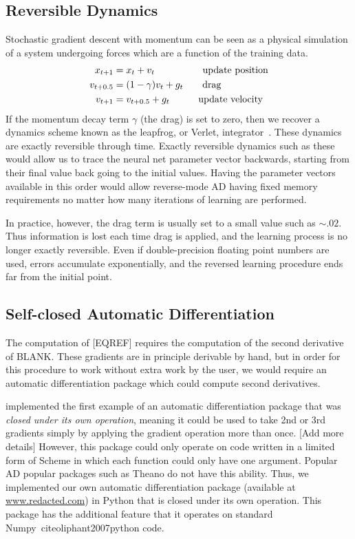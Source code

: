 \documentclass{article}
\newcommand{\drag}{\gamma}
\begin{document}
\subsection{Reversible Dynamics}

Stochastic gradient descent with momentum can be seen as a physical simulation of a system undergoing forces which are a function of the training data.
\begin{align}
x_{t+1} & = x_t + v_t \qquad \qquad \quad \textnormal{update position}\\
v_{t+0.5} & = (1 - \drag) v_t + g_t \quad \quad \textnormal{drag}\\
v_{t+1} & = v_{t+0.5} + g_t \qquad \quad \textnormal{update velocity}
\end{align}
If the momentum decay term $\gamma$ (the drag) is set to zero, then we recover a dynamics scheme known as the leapfrog, or Verlet, integrator~\citep{leapfrog1995}.
These dynamics are exactly reversible through time.
Exactly reversible dynamics such as these would allow us to trace the neural net parameter vector backwards, starting from their final value back going to the initial values.
Having the parameter vectors available in this order would allow reverse-mode AD having fixed memory requirements no matter how many iterations of learning are performed.

In practice, however, the drag term is usually set to a small value such as $\sim.02$.
Thus information is lost each time drag is applied, and the learning process is no longer exactly reversible.
Even if double-precision floating point numbers are used, errors accumulate exponentially, and the reversed learning procedure ends far from the initial point.



\subsection{Self-closed Automatic Differentiation}

The computation of [EQREF] requires the computation of the second derivative of BLANK.
These gradients are in principle derivable by hand, but in order for this procedure to work without extra work by the user, we would require an automatic differentiation package which could compute second derivatives.

\citet{pearlmutter2008reverse} implemented the first example of an automatic differentiation package that was \emph{closed under its own operation}, meaning it could be used to take 2nd or 3rd gradients simply by applying the gradient operation more than once. [Add more details]
However, this package could only operate on code written in a limited form of Scheme in which each function could only have one argument.
Popular AD popular packages such as Theano do not have this ability.
Thus, we implemented our own automatic differentiation package (available at \url{www.redacted.com}) in Python that is closed under its own operation.
This package has the additional feature that it operates on standard Numpy~cite{oliphant2007python} code.
\end{document}
